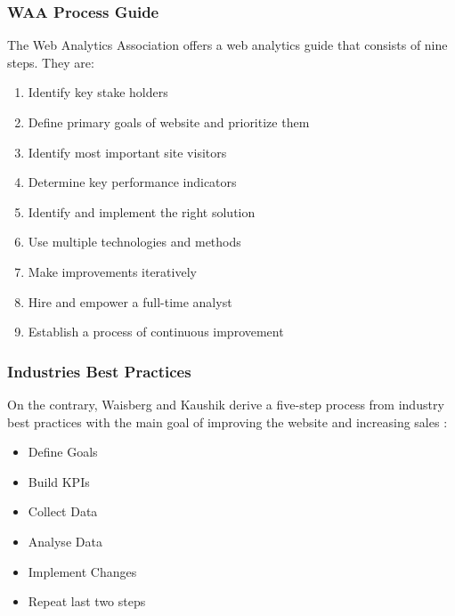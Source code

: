 \subsubsection{WAA Process Guide}


The Web Analytics Association offers a web analytics guide that consists of nine steps. They are: \cite{2009Jansen} %

\begin{enumerate}
\item Identify key stake holders
\item Define primary goals of website and prioritize them
\item Identify most important site visitors
\item Determine key performance indicators
\item Identify and implement the right solution
\item Use multiple technologies and methods
\item Make improvements iteratively
\item Hire and empower a full-time analyst
\item Establish a process of continuous improvement
\end{enumerate}


\subsubsection{Industries Best Practices}

On the contrary, Waisberg and Kaushik derive a five-step process from industry best practices with the main goal of improving the website and increasing sales \cite{2009Waisberg}: %

\begin{itemize}
\item Define Goals
\item Build KPIs
\item Collect Data
\item Analyse Data
\item Implement Changes
\item Repeat last two steps
\end{itemize}



